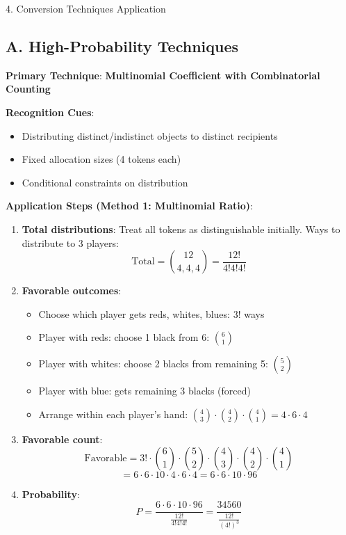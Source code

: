 \documentclass[12pt]{article}
\begin{document}
\begin{conversionbox}{4. Conversion Techniques Application}

\subsection*{A. High-Probability Techniques}

\textbf{Primary Technique}: \textbf{Multinomial Coefficient with Combinatorial Counting}

\textbf{Recognition Cues}:
\begin{itemize}
    \item Distributing distinct/indistinct objects to distinct recipients
    \item Fixed allocation sizes (4 tokens each)
    \item Conditional constraints on distribution
\end{itemize}

\textbf{Application Steps (Method 1: Multinomial Ratio)}:
\begin{enumerate}
    \item \textbf{Total distributions}: Treat all tokens as distinguishable initially. Ways to distribute to 3 players:
    \[\text{Total} = \binom{12}{4,4,4} = \frac{12!}{4!4!4!}\]
    
    \item \textbf{Favorable outcomes}: 
    \begin{itemize}
        \item Choose which player gets reds, whites, blues: $3!$ ways
        \item Player with reds: choose 1 black from 6: $\binom{6}{1}$
        \item Player with whites: choose 2 blacks from remaining 5: $\binom{5}{2}$
        \item Player with blue: gets remaining 3 blacks (forced)
        \item Arrange within each player's hand: $\binom{4}{3} \cdot \binom{4}{2} \cdot \binom{4}{1} = 4 \cdot 6 \cdot 4$
    \end{itemize}
    
    \item \textbf{Favorable count}:
    \[\text{Favorable} = 3! \cdot \binom{6}{1} \cdot \binom{5}{2} \cdot \binom{4}{3} \cdot \binom{4}{2} \cdot \binom{4}{1}\]
    \[= 6 \cdot 6 \cdot 10 \cdot 4 \cdot 6 \cdot 4 = 6 \cdot 6 \cdot 10 \cdot 96\]
    
    \item \textbf{Probability}:
    \[P = \frac{6 \cdot 6 \cdot 10 \cdot 96}{\frac{12!}{4!4!4!}} = \frac{34560}{\frac{12!}{(4!)^3}}\]
    

\end{enumerate}
\end{conversionbox}
\end{document}
